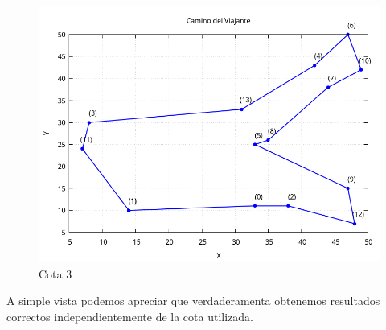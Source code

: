\documentclass[11pt,openany]{book}
\begin{document}
\begin{figure}[H]
\begin{minipage}{.48\textwidth}
            \centering
            \includegraphics[width=1\linewidth]{assets/Img/Cota_3_BB/grafico_14_1_cota3.png}
            \caption{Cota 3}
            \label{fig:Nodos}
      \end{minipage}
\end{figure}


A simple vista podemos apreciar que verdaderamenta obtenemos resultados correctos independientemente de la 
cota utilizada.
\end{document}
